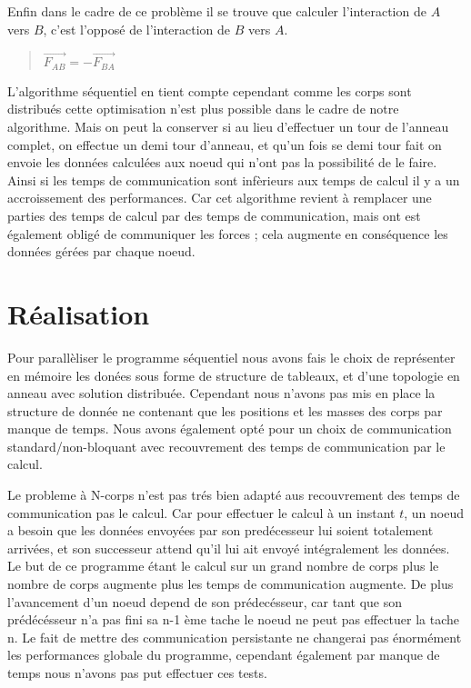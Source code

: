 \par Enfin dans le cadre de ce problème il se trouve que calculer l'interaction de $A$
vers $B$, c'est l'opposé de l'interaction de $B$ vers $A$.

\begin{quote}
  \begin{center}
    $ \overrightarrow{F_{AB}} = -\overrightarrow{F_{BA}} $
  \end{center}
\end{quote}

\par L'algorithme séquentiel en tient compte cependant comme les corps sont distribués
cette optimisation n'est plus possible dans le cadre de notre algorithme.
Mais on peut la conserver si au lieu d'effectuer un tour de l'anneau complet, on effectue
un demi tour d'anneau, et qu'un fois se demi tour fait on envoie les données calculées 
aux noeud qui n'ont pas la possibilité de le faire. Ainsi si les temps de communication
sont infèrieurs aux temps de calcul il y a un accroissement des performances. Car 
cet algorithme revient à remplacer une parties des temps de calcul par des temps de communication, 
mais ont est également obligé de communiquer les forces ; cela augmente en conséquence 
les données gérées par chaque noeud.\\

\section{Réalisation}

\par Pour parallèliser le programme séquentiel nous avons fais le choix de représenter
en mémoire les donées sous forme de structure de tableaux, et d'une topologie en anneau avec
solution distribuée.
Cependant nous n'avons pas mis en place la structure de donnée ne contenant que les 
positions et les masses des corps par manque de temps. Nous avons également opté pour un 
choix de communication standard/non-bloquant avec recouvrement des temps de
communication par le calcul.\\

\par Le probleme à N-corps n'est pas trés bien adapté aus recouvrement des temps de 
communication pas le calcul. Car pour effectuer le calcul à un instant $t$, un noeud a 
besoin que les données envoyées par son predécesseur lui soient totalement arrivées, 
et son successeur attend qu'il lui ait envoyé intégralement les données. Le but de ce programme 
étant le calcul sur un grand nombre de corps plus le nombre de corps augmente plus les temps de 
communication augmente. De plus l'avancement d'un noeud depend de son prédecésseur, car tant que 
son prédécésseur n'a pas fini sa n-1 ème tache le noeud ne peut pas effectuer la tache n.
Le fait de mettre des communication persistante ne changerai pas énormément les performances
globale du programme, cependant également par manque de temps nous n'avons pas put effectuer 
ces tests.\\

